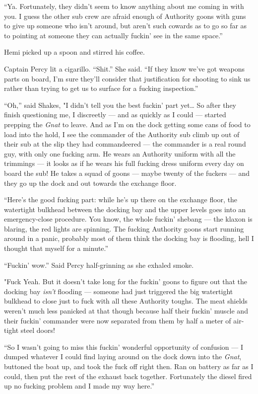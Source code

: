 \documentclass[]{scrbook}
\begin{document}
``Ya. Fortunately, they didn't seem to know anything about me coming in
with you. I guess the other sub crew are afraid enough of Authority
goons with guns to give up someone who isn't around, but aren't such
cowards as to go so far as to pointing at someone they can actually
fuckin' see in the same space.''

Hemi picked up a spoon and stirred his coffee.

Captain Percy lit a cigarillo. ``Shit.'' She said. ``If they know we've
got weapons parts on board, I'm sure they'll consider that justification
for shooting to sink us rather than trying to get us to surface for a
fucking inspection.''

``Oh,'' said Shakes, "I didn't tell you the best fuckin' part
yet\ldots{} So after they finish questioning me, I discreetly --- and as
quickly as I could --- started prepping the \emph{Gnat} to leave. And as
I'm on the dock getting some cans of food to load into the hold, I see
the commander of the Authority sub climb up out of their sub at the slip
they had commandeered --- the commander is a real round guy, with only
one fucking arm. He wears an Authority uniform with all the trimmings
--- it looks as if he wears his full fucking dress uniform every day on
board the sub! He takes a squad of goons --- maybe twenty of the fuckers
--- and they go up the dock and out towards the exchange floor.

``Here's the good fucking part: while he's up there on the exchange
floor, the watertight bulkhead between the docking bay and the upper
levels goes into an emergency-close procedure. You know, the whole
fuckin' shebang --- the klaxon is blaring, the red lights are spinning.
The fucking Authority goons start running around in a panic, probably
most of them think the docking bay is flooding, hell I thought that
myself for a minute.''

``Fuckin' wow.'' Said Percy half-grinning as she exhaled smoke.

"Fuck Yeah. But it doesn't take long for the fuckin' goons to figure out
that the docking bay \emph{isn't} flooding --- someone had just
triggered the big watertight bulkhead to close just to fuck with all
these Authority toughs. The meat shields weren't much less panicked at
that though because half their fuckin' muscle and their fuckin'
commander were now separated from them by half a meter of air-tight
steel doors!

``So I wasn't going to miss this fuckin' wonderful opportunity of
confusion --- I dumped whatever I could find laying around on the dock
down into the \emph{Gnat}, buttoned the boat up, and took the fuck off
right then. Ran on battery as far as I could, then put the rest of the
exhaust back together. Fortunately the diesel fired up no fucking
problem and I made my way here.''
\end{document}
